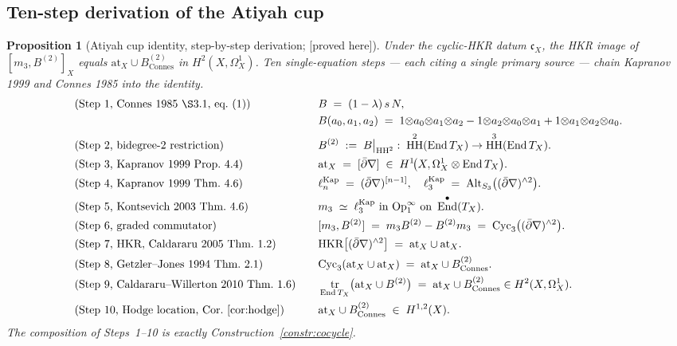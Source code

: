 \documentclass[11pt,reqno]{amsart}
\theoremstyle{plain}
\newtheorem{proposition}[theorem]{Proposition}
\theoremstyle{definition}
\theoremstyle{remark}
\providecommand{\ClaimStatusProvedHere}{\textnormal{[proved here]}}
\DeclareMathOperator{\End}{End}
\DeclareMathOperator{\tr}{tr}
\DeclareMathOperator{\HH}{HH}
\newcommand{\at}{\mathrm{at}}
\begin{document}
\subsection{Ten-step derivation of the Atiyah cup}
\label{sub:atiyah-cup}

\begin{proposition}[Atiyah cup identity, step-by-step derivation; \ClaimStatusProvedHere]
\label{prop:atiyah-cup-derivation}
Under the cyclic-HKR datum $\mathfrak c_X$, the HKR image of
$[m_3, B^{(2)}]_X$ equals $\at_X \cup B^{(2)}_{\mathrm{Connes}}$ in
$H^2(X, \Omega^1_X)$. Ten single-equation steps --- each citing a single
primary source --- chain Kapranov 1999 and Connes 1985 into the identity.
\begin{align*}
&\textup{(Step 1, Connes 1985 \S3.1, eq.~(1))}\quad && B \;=\; (1 - \lambda)\,s\,N, \\
&&& B(a_0, a_1, a_2) \;=\; 1{\otimes}a_0{\otimes}a_1{\otimes}a_2 - 1{\otimes}a_2{\otimes}a_0{\otimes}a_1 + 1{\otimes}a_1{\otimes}a_2{\otimes}a_0. \\
&\textup{(Step 2, bidegree-$2$ restriction)}\quad && B^{(2)} \;:=\; B\bigl|_{\HH^2} \;:\; \HH^2(\End T_X) \to \HH^3(\End T_X). \\
&\textup{(Step 3, Kapranov 1999 Prop.~4.4)}\quad && \at_X \;=\; [\bar\partial\nabla] \;\in\; H^1\!\bigl(X, \Omega^1_X \otimes \End T_X\bigr). \\
&\textup{(Step 4, Kapranov 1999 Thm.~4.6)}\quad && \ell_n^{\mathrm{Kap}} \;=\; (\bar\partial\nabla)^{[n-1]}, \quad \ell_3^{\mathrm{Kap}} \;=\; \mathrm{Alt}_{S_3}\bigl((\bar\partial\nabla)^{\wedge 2}\bigr). \\
&\textup{(Step 5, Kontsevich 2003 Thm.~4.6)}\quad && m_3 \;\simeq\; \ell_3^{\mathrm{Kap}} \text{ in }\mathrm{Op}^\infty_1 \text{ on }\End^\bullet(T_X). \\
&\textup{(Step 6, graded commutator)}\quad && [m_3, B^{(2)}] \;=\; m_3 B^{(2)} - B^{(2)} m_3 \;=\; \mathrm{Cyc}_3\bigl((\bar\partial\nabla)^{\wedge 2}\bigr). \\
&\textup{(Step 7, HKR, Caldararu 2005 Thm.~1.2)}\quad && \mathrm{HKR}\bigl[(\bar\partial\nabla)^{\wedge 2}\bigr] \;=\; \at_X \cup \at_X. \\
&\textup{(Step 8, Getzler--Jones 1994 Thm.~2.1)}\quad && \mathrm{Cyc}_3(\at_X \cup \at_X) \;=\; \at_X \cup B^{(2)}_{\mathrm{Connes}}. \\
&\textup{(Step 9, Caldararu--Willerton 2010 Thm.~1.6)}\quad && \tr_{\End T_X}\bigl(\at_X \cup B^{(2)}\bigr) \;=\; \at_X \cup B^{(2)}_{\mathrm{Connes}} \in H^2(X, \Omega^1_X). \\
&\textup{(Step 10, Hodge location, Cor.~\ref{cor:hodge})}\quad && \at_X \cup B^{(2)}_{\mathrm{Connes}} \;\in\; H^{1,2}(X).
\end{align*}
The composition of Steps~1--10 is exactly Construction~\ref{constr:cocycle}.
\end{proposition}
\end{document}
